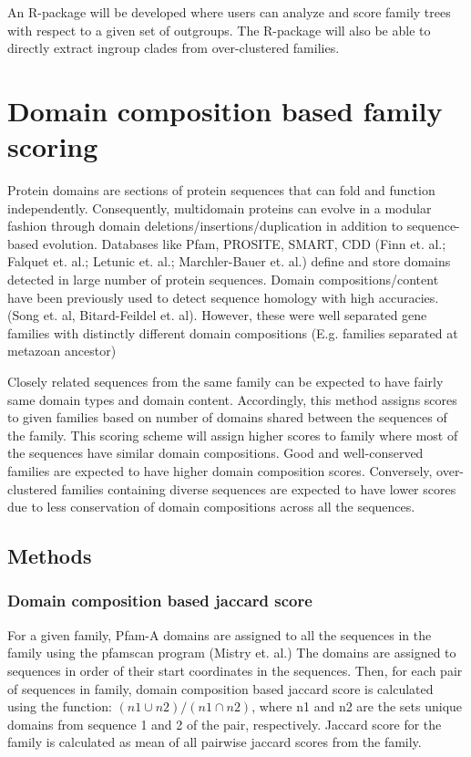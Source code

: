 \documentclass{article}
\begin{document}
		An R-package will be developed where users can analyze and score family trees with respect to a given set of outgroups. The R-package will also be able to directly extract ingroup clades from over-clustered families.
		\pagebreak
		
	\section{Domain composition based family scoring}
	Protein domains are sections of protein sequences that can fold and function independently. Consequently, multidomain proteins can evolve in a modular fashion through domain deletions/insertions/duplication in addition to sequence-based evolution. Databases like Pfam, PROSITE, SMART, CDD (Finn et. al.; Falquet et. al.; Letunic et. al.; Marchler-Bauer et. al.) define and store domains detected in large number of protein sequences. Domain compositions/content have been previously used to detect sequence homology with high accuracies. (Song et. al, Bitard-Feildel et. al). However, these were well separated gene families with distinctly different domain compositions (E.g. families separated at metazoan ancestor)
	
	Closely related sequences from the same family can be expected to have fairly same domain types and domain content. Accordingly, this method assigns scores to given families based on number of domains shared between the sequences of the family. This scoring scheme will assign higher scores to family where most of the sequences have similar domain compositions. Good and well-conserved families are expected to have higher domain composition scores. Conversely, over-clustered families containing diverse sequences are expected to have lower scores due to less conservation of domain compositions across all the sequences.
	
	\subsection{Methods}
		\subsubsection{Domain composition based jaccard score}
		For a given family, Pfam-A domains are assigned to all the sequences in the family using the pfamscan program (Mistry et. al.) The domains are assigned  to sequences in order of their start coordinates in the sequences. Then, for each pair of sequences in family, domain composition based jaccard score is calculated using the function: $(n1 \cup  n2)/(n1 \cap n2)$, where n1 and n2 are the sets unique domains from sequence 1 and 2 of the pair, respectively. Jaccard score for the family is calculated as mean of all pairwise jaccard scores from the family.
		
\end{document}
